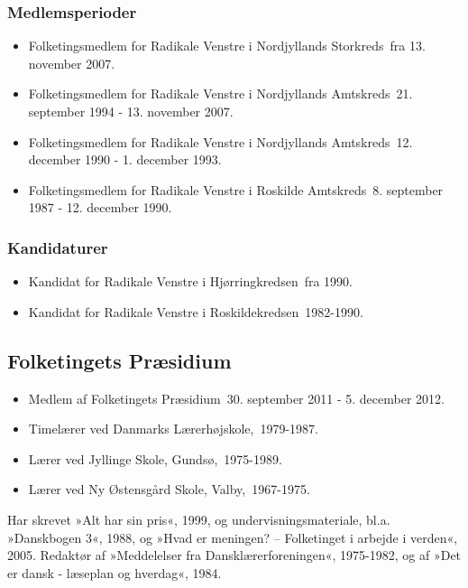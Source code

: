 \documentclass[11pt, a4paper]{awesome-cv}
\begin{document}
\begin{cvletter}
\subsubsection*{Medlemsperioder}
\begin{itemize}
\item Folketingsmedlem for Radikale Venstre i Nordjyllands Storkreds fra 13. november 2007.
\item Folketingsmedlem for Radikale Venstre i Nordjyllands Amtskreds 21. september 1994 - 13. november 2007.
\item Folketingsmedlem for Radikale Venstre i Nordjyllands Amtskreds 12. december 1990 - 1. december 1993.
\item Folketingsmedlem for Radikale Venstre i Roskilde Amtskreds 8. september 1987 - 12. december 1990.
\end{itemize}
\subsubsection*{Kandidaturer}
\begin{itemize}
\item Kandidat for Radikale Venstre i Hjørringkredsen fra 1990.
\item Kandidat for Radikale Venstre i Roskildekredsen 1982-1990.
\end{itemize}
\subsection*{Folketingets Præsidium}
\begin{itemize}
\item Medlem af Folketingets Præsidium 30. september 2011 - 5. december 2012.
\end{itemize}
\begin{itemize}
\item Timelærer ved Danmarks Lærerhøjskole, 1979-1987.
\item Lærer ved Jyllinge Skole, Gundsø, 1975-1989.
\item Lærer ved Ny Østensgård Skole, Valby, 1967-1975.
\end{itemize}
Har skrevet »Alt har sin pris«, 1999, og undervisningsmateriale, bl.a. »Danskbogen 3«, 1988, og »Hvad er meningen? – Folketinget i arbejde i verden«, 2005. Redaktør af »Meddelelser fra Dansklærerforeningen«, 1975-1982, og af »Det er dansk - læseplan og hverdag«, 1984.

\end{cvletter}
\end{document}

